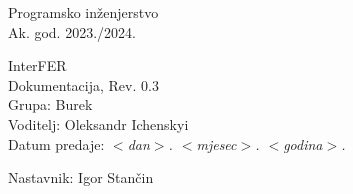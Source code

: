 \documentclass[12pt]{report}
\begin{document}
\begin{titlepage}
	\begin{center}
		\LARGE Programsko inženjerstvo\\
		\large Ak. god. 2023./2024.\\


		\huge InterFER\\
		\Large Dokumentacija, Rev. 0.3\\

		\normalsize
		Grupa: Burek\\
		Voditelj: Oleksandr Ichenskyi\\


		Datum predaje: \textit{$<$dan$>$. $<$mjesec$>$. $<$godina$>$.}\\


		Nastavnik: Igor Stančin\\

	\end{center}


\end{titlepage}


\tableofcontents











\begingroup
\renewcommand*\listfigurename{Indeks slika i dijagrama}
\listoffigures
\endgroup
{}



\eject


\end{document}
